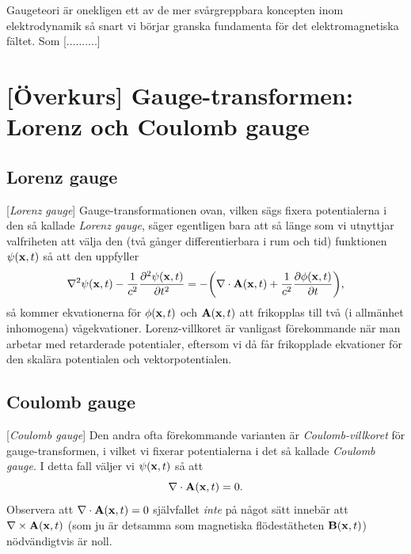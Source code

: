Gaugeteori {\"a}r onekligen ett av de mer sv{\aa}rgreppbara koncepten inom
elektrodynamik s{\aa} snart vi b{\"o}rjar granska fundamenta f{\"o}r det
elektromagnetiska f{\"a}ltet. Som [..........]




\section{[{\"O}verkurs] Gauge-transformen: Lorenz och Coulomb gauge}
\subsection{Lorenz gauge}
[{{\it Lorenz gauge}}]
Gauge-transformationen ovan, vilken s{\"a}gs fixera potentialerna i den s{\aa}
kallade {\it Lorenz gauge},
s{\"a}ger egentligen bara att s{\aa} l{\"a}nge som vi utnyttjar valfriheten att
v{\"a}lja den (tv{\aa} g{\aa}nger differentierbara i rum och tid) funktionen
$\psi({\bf x},t)$ s{\aa} att den uppfyller
$$
  \nabla^2\psi({\bf x},t)
    -{{1}\over{c^2}}{{\partial^2\psi({\bf x},t)}\over{\partial t^2}}
  =-\bigg(
      \nabla\cdot{\bf A}({\bf x},t)
        +{{1}\over{c^2}}{{\partial\phi({\bf x},t)}\over{\partial t}}
     \bigg),
$$
s{\aa} kommer ekvationerna f{\"o}r $\phi({\bf x},t)$ och ${\bf A}({\bf x},t)$
att frikopplas till tv{\aa} (i allm{\"a}nhet inhomogena) v{\aa}gekvationer.
Lorenz-villkoret {\"a}r vanligast f{\"o}rekommande n{\"a}r man arbetar med
retarderade potentialer, eftersom vi d{\aa} f{\aa}r frikopplade ekvationer
f{\"o}r den skal{\"a}ra potentialen och
vektorpotentialen.

\subsection{Coulomb gauge}
[{{\it Coulomb gauge}}]
Den andra ofta f{\"o}rekommande varianten {\"a}r {\it Coulomb-villkoret}
f{\"o}r gauge-transformen, i vilket vi fixerar potentialerna i det s{\aa}
kallade {\it Coulomb gauge}. I detta fall v{\"a}ljer vi $\psi({\bf x},t)$
s{\aa} att
$$
  \nabla\cdot{\bf A}({\bf x},t)=0.
$$
Observera att $\nabla\cdot{\bf A}({\bf x},t)=0$ sj{\"a}lvfallet {\it inte}
p{\aa} n{\aa}got s{\"a}tt inneb{\"a}r att $\nabla\times{\bf A}({\bf x},t)$
(som ju {\"a}r detsamma som magnetiska fl{\"o}dest{\"a}theten
${\bf B}({\bf x},t)$) n{\"o}dv{\"a}ndigtvis {\"a}r noll.

